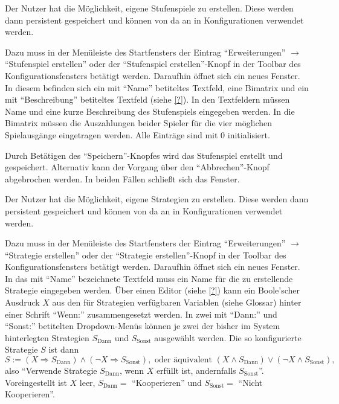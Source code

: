 \documentclass[parskip=full,11pt]{scrartcl}
\begin{document}
Der Nutzer hat die Möglichkeit, eigene Stufenspiele zu erstellen. Diese werden dann persistent gespeichert und können von da an in Konfigurationen verwendet werden.

Dazu muss in der Menüleiste des Startfensters der Eintrag \enquote{Erweiterungen} \(\rightarrow\) \enquote{Stufenspiel erstellen} oder der \enquote{Stufenspiel erstellen}-Knopf in der Toolbar des Konfigurationsfensters betätigt werden. Daraufhin öffnet sich ein neues Fenster. In diesem befinden sich ein mit \enquote{Name} betiteltes Textfeld, eine Bimatrix und ein mit \enquote{Beschreibung} betiteltes Textfeld (siehe \cref{?}). In den Textfeldern müssen Name und eine kurze Beschreibung des Stufenspiels eingegeben werden. In die Bimatrix müssen die Auszahlungen beider Spieler für die vier möglichen Spielausgänge eingetragen werden. Alle Einträge sind mit \(0\) initialisiert.

Durch Betätigen des \enquote{Speichern}-Knopfes wird das Stufenspiel erstellt und gespeichert. Alternativ kann der Vorgang über den \enquote{Abbrechen}-Knopf abgebrochen werden. In beiden Fällen schließt sich das Fenster.

Der Nutzer hat die Möglichkeit, eigene Strategien zu erstellen. Diese werden dann persistent gespeichert und können von da an in Konfigurationen verwendet werden.

Dazu muss in der Menüleiste des Startfensters der Eintrag \enquote{Erweiterungen} \(\rightarrow\) \enquote{Strategie erstellen} oder der \enquote{Strategie erstellen}-Knopf in der Toolbar des Konfigurationsfensters betätigt werden. Daraufhin öffnet sich ein neues Fenster. In das mit \enquote{Name} bezeichnete Textfeld muss ein Name für die zu erstellende Strategie eingegeben werden. Über einen Editor (siehe \cref{?}) kann ein Boole'scher Ausdruck \(X\) aus den für Strategien verfügbaren Variablen (siehe Glossar) hinter einer Schrift \enquote{Wenn:} zusammengesetzt werden. In zwei mit \enquote{Dann:} und \enquote{Sonst:} betitelten Dropdown-Menüs können je zwei der bisher im System hinterlegten Strategien \(S_\text{Dann}\) und \(S_\text{Sonst}\) ausgewählt werden. Die so konfigurierte Strategie \(S\) ist dann
\[
S := (X \Rightarrow S_\text{Dann}) \land (\lnot X \Rightarrow S_\text{Sonst}), \text{ oder äquivalent } (X \land S_\text{Dann}) \lor (\lnot X \land S_\text{Sonst}),
\]
also \enquote{Verwende Strategie \(S_\text{Dann}\), wenn \(X\) erfüllt ist, andernfalls \(S_\text{Sonst}\)}. Voreingestellt ist \(X\) leer, \(S_\text{Dann} =\) \enquote{Kooperieren} und \(S_\text{Sonst} =\) \enquote{Nicht Kooperieren}.
\end{document}
